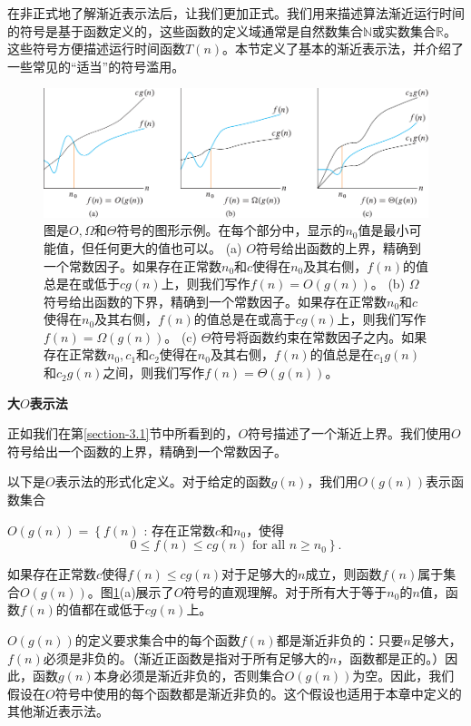 \documentclass[lang=cn,newtx,10pt,scheme=chinese]{elegantbook}
\begin{document}
在非正式地了解渐近表示法后，让我们更加正式。我们用来描述算法渐近运行时间的符号是基于函数定义的，这些函数的定义域通常是自然数集合$\mathbb{N}$或实数集合$\mathbb{R}$。这些符号方便描述运行时间函数$T(n)$。本节定义了基本的渐近表示法，并介绍了一些常见的``适当''的符号滥用。

\begin{figure}
    \centering
    \includegraphics{算法导论第四版插图/第二章/渐近时间复杂度比较示意图.pdf}
    \caption{图是$O, \Omega$和$\Theta$符号的图形示例。在每个部分中，显示的$n_0$值是最小可能值，但任何更大的值也可以。 (a) $O$符号给出函数的上界，精确到一个常数因子。如果存在正常数$n_0$和$c$使得在$n_0$及其右侧，$f(n)$的值总是在或低于$cg(n)$上，则我们写作$f(n)=O(g(n))$。 (b) $\Omega$符号给出函数的下界，精确到一个常数因子。如果存在正常数$n_0$和$c$使得在$n_0$及其右侧，$f(n)$的值总是在或高于$cg(n)$上，则我们写作$f(n)=\Omega(g(n))$。 (c) $\Theta$符号将函数约束在常数因子之内。如果存在正常数$n_0,c_1$和$c_2$使得在$n_0$及其右侧，$f(n)$的值总是在$c_1g(n)$和$c_2g(n)$之间，则我们写作$f(n)=\Theta(g(n))$。}
    \label{fig:渐近时间复杂度比较示意图}
\end{figure}

\textbf{大$O$表示法}

正如我们在第\ref{section-3.1}节中所看到的，$O$符号描述了一个渐近上界。我们使用$O$符号给出一个函数的上界，精确到一个常数因子。

以下是$O$表示法的形式化定义。对于给定的函数$g(n)$，我们用$O(g(n))$表示函数集合

$O(g(n))=\left\{f(n)\right.$ : 存在正常数$c$和$n_0$，使得
$$
\left.0 \leq f(n) \leq c g(n) \text { for all } n \geq n_0\right\} .
$$

如果存在正常数$c$使得$f(n) \leq c g(n)$对于足够大的$n$成立，则函数$f(n)$属于集合$O(g(n))$。图\ref{fig:渐近时间复杂度比较示意图}(a)展示了$O$符号的直观理解。对于所有大于等于$n_0$的$n$值，函数$f(n)$的值都在或低于$cg(n)$上。

$O(g(n))$的定义要求集合中的每个函数$f(n)$都是渐近非负的：只要$n$足够大，$f(n)$必须是非负的。（渐近正函数是指对于所有足够大的$n$，函数都是正的。）因此，函数$g(n)$本身必须是渐近非负的，否则集合$O(g(n))$为空。因此，我们假设在$O$符号中使用的每个函数都是渐近非负的。这个假设也适用于本章中定义的其他渐近表示法。
\end{document}
